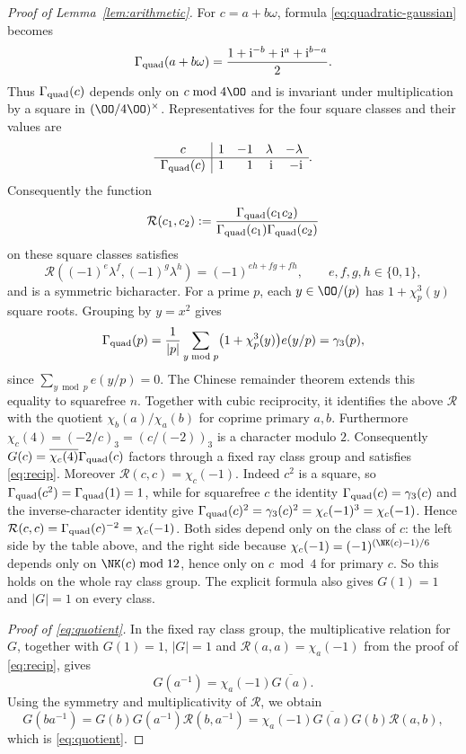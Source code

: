 \begin{proof}[Proof of Lemma~\ref{lem:arithmetic}]
For $c=a+b\omega$, formula \eqref{eq:quadratic-gaussian} becomes
\[
 \Gamma_{\rm quad}(a+b\omega)=\frac{1+\mathrm i^{-b}+\mathrm i^a+\mathrm i^{b-a}}2.
\]
Thus $\Gamma_{\rm quad}(c)$ depends only on $c\bmod4\OO$ and is invariant under
multiplication by a square in $(\OO/4\OO)^\times$. Representatives
for the four square classes and their values are
\[
 \begin{array}{c|rrrr}
 c&1&-1&\lambda&-\lambda\\ \hline
 \Gamma_{\rm quad}(c)&1&1&\mathrm i&-\mathrm i
 \end{array}.
\]
Consequently the function
\[
 \mathcal R(c_1,c_2):=\frac{\Gamma_{\rm quad}(c_1c_2)}{\Gamma_{\rm quad}(c_1)\Gamma_{\rm quad}(c_2)}
\]
on these square classes satisfies
\[
 \mathcal R((-1)^e\lambda^f,(-1)^g\lambda^h)=(-1)^{eh+fg+fh},
 \qquad e,f,g,h\in\{0,1\},
\]
and is a symmetric bicharacter.
For a prime $p$, each $y\in\OO/(p)$ has $1+\chi_p^3(y)$ square roots.
Grouping by $y=x^2$ gives
\[
 \Gamma_{\rm quad}(p)
 =\frac1{|p|}\sum_{y\bmod p}\bigl(1+\chi_p^3(y)\bigr)e(y/p)
 =\gamma_3(p),
\]
since $\sum_{y\bmod p}e(y/p)=0$.
The Chinese remainder theorem extends this equality to squarefree
$n$. Together with cubic reciprocity, it identifies the above $\mathcal R$
with the quotient $\chi_b(a)/\chi_a(b)$ for coprime primary $a,b$.
Furthermore $\chi_c(4)=(-2/c)_3=(c/(-2))_3$ is a character modulo
$2$. Consequently $G(c)=\overline{\chi_c(4)}\Gamma_{\rm quad}(c)$ factors through a fixed ray class group
and satisfies \eqref{eq:recip}. Moreover $\mathcal R(c,c)=\chi_c(-1)$. Indeed $c^2$ is a square,
so $\Gamma_{\rm quad}(c^2)=\Gamma_{\rm quad}(1)=1$, while for squarefree $c$ the identity
$\Gamma_{\rm quad}(c)=\gamma_3(c)$ and the inverse-character identity give
$\Gamma_{\rm quad}(c)^2=\gamma_3(c)^2=\chi_c(-1)^3=\chi_c(-1)$. Hence
$\mathcal R(c,c)=\Gamma_{\rm quad}(c)^{-2}=\chi_c(-1)$. Both sides depend only on the class of $c$: the left side by the table above, and the right
side because $\chi_c(-1)=(-1)^{(\NK(c)-1)/6}$ depends only on $\NK(c)\bmod12$, hence only on
$c\bmod4$ for primary $c$. So this holds on the whole ray class group. The explicit formula also gives $G(1)=1$ and $|G|=1$
on every class.

\par\noindent\textit{Proof of \eqref{eq:quotient}.}\quad
In the fixed ray class group, the multiplicative relation for $G$, together with $G(1)=1$,
$|G|=1$ and $\mathcal R(a,a)=\chi_a(-1)$ from the proof of \eqref{eq:recip}, gives
\[
 G(a^{-1})=\chi_a(-1)\overline{G(a)}.
\]
Using the symmetry and multiplicativity of $\mathcal R$, we obtain
\[
 G(ba^{-1}) =G(b)G(a^{-1})\mathcal R(b,a^{-1}) =\chi_a(-1)\overline{G(a)}G(b)\mathcal R(a,b),
\]
which is \eqref{eq:quotient}.


\end{proof}
